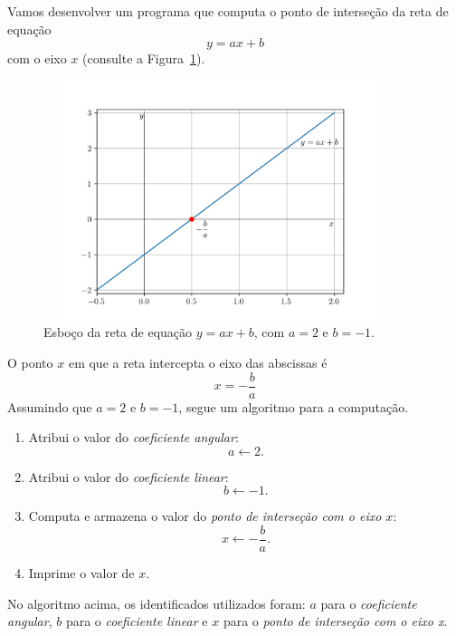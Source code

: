 \begin{ex}\label{cap_lingua_sec_dados:ex:reta}
  Vamos desenvolver um programa que computa o ponto de interseção da reta de equação
  \begin{equation}
    y = ax + b
  \end{equation}
  com o eixo $x$ (consulte a Figura~\ref{cap_lingua_sec_dados:fig:ex_reta}).

  \begin{figure}[h]
    \centering
    \includegraphics[max width=0.9\textwidth, height=2.75in]{./cap_lingua/dados/fig_ex_reta/fig}
    \caption{Esboço da reta de equação $y = ax + b$, com $a=2$ e $b=-1$.}
    \label{cap_lingua_sec_dados:fig:ex_reta}
  \end{figure}

  O ponto $x$ em que a reta intercepta o eixo das abscissas é
  \begin{equation}
    x = -\frac{b}{a}
  \end{equation}
  Assumindo que $a=2$ e $b=-1$, segue um algoritmo para a computação.
  \begin{enumerate}
  \item Atribui o valor do \emph{coeficiente angular}:
    \begin{equation}
      a\leftarrow 2.
    \end{equation}
  \item Atribui o valor do \emph{coeficiente linear}:
    \begin{equation}
      b\leftarrow -1.
    \end{equation}
  \item Computa e armazena o valor do \emph{ponto de interseção com o eixo $x$}:
    \begin{equation}
      x \leftarrow -\frac{b}{a}.
    \end{equation}
  \item Imprime o valor de $x$.
  \end{enumerate}

  No algoritmo acima, os identificados utilizados foram: $a$ para o \emph{coeficiente angular}, $b$ para o \emph{coeficiente linear} e $x$ para o \emph{ponto de interseção com o eixo x}.
\end{ex}



